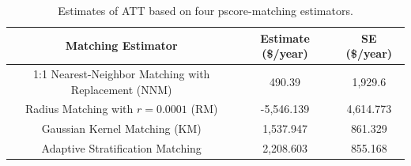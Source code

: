 \documentclass[
]{article}
\begin{document}
\begin{table}[h]
\centering
\begin{tabular}{ccc}
\hline \hline
\textbf{Matching Estimator} & \textbf{Estimate (\$/year)} & \textbf{SE (\$/year)} \\ \hline
1:1 Nearest-Neighbor Matching with Replacement (NNM)       &  490.39 & 1,929.6  \\
Radius Matching with $r=0.0001$ (RM)  &  -5,546.139 &  4,614.773 \\
Gaussian Kernel Matching (KM)        &  1,537.947 & 861.329  \\ 
Adaptive Stratification Matching     &  2,208.603 &  855.168 \\ \hline
\end{tabular}
\caption{Estimates of ATT based on four pscore-matching estimators.}
\label{tab:Tab25-4_2}
\end{table}
\end{document}
